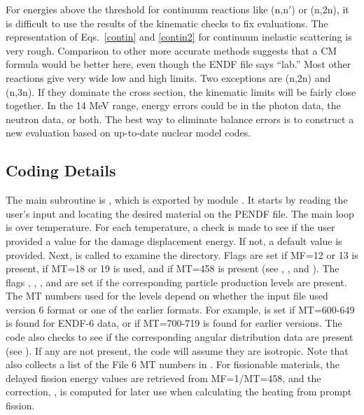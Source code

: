 For energies above the threshold for continuum reactions like
(n,n$'$) or (n,2n), it is difficult to use the results of the
kinematic checks to fix evaluations.  The representation of
Eqs.~\ref{contin} and \ref{contin2} for continuum inelastic
scattering is very rough.  Comparison to other more accurate
methods suggests that a CM formula would be better
here\cite{advanced}, even though the ENDF file says ``lab.''
Most other reactions give very wide low and high limits.  Two
exceptions are (n,2n) and (n,3n).  If they dominate the cross
section, the kinematic limits will be fairly close together.
In the 14 MeV range, energy errors could be in the photon data,
the neutron data, or both.  The best way to eliminate balance
errors is to construct a new evaluation based on up-to-date
nuclear model codes.

\subsection{Coding Details}
\label{ssHEATR_details}

The main subroutine is , which is
exported by module .
It starts by reading the user's input and locating the desired
material on the PENDF file.  The main loop is over
temperature.  For each temperature, a check is made to see if
the user provided a value for the damage displacement energy.
If not, a default value is provided.  Next, 
 is called to examine the directory.  Flags
are set if MF=12 or 13 is present, if MT=18 or 19 is used, and if
MT=458 is present (see , , and ).
The flags , , , 
and  are set if the corresponding particle production
levels are present.  The MT numbers used for the levels depend on
whether the input file used version 6 format or one of the earlier
formats.  For example,  is set if MT=600-649 is found
for ENDF-6 data, or if MT=700-719 is found for earlier versions.
The code also checks to see if the corresponding angular distribution
data are present (see ).  If any are not present, the
code will assume they are isotropic.  Note that  also
collects a list of the File 6 MT numbers in .
For fissionable materials, the delayed fission energy values
are retrieved from MF=1/MT=458, and the correction, , is
computed for later use when calculating the heating from prompt
fission.

